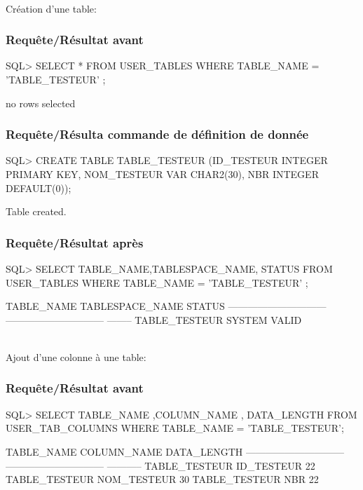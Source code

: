 \documentclass[•]{article}
\begin{document}
\textrm{ }
\\
\textrm{Création d'une table:}
\subsubsection{Requête/Résultat avant}
\begin{sql}
 SQL> SELECT * FROM USER_TABLES WHERE TABLE_NAME = 'TABLE_TESTEUR' ;

no rows selected
\end{sql}
\subsubsection{Requête/Résulta commande de définition de donnée}
\begin{sql}
SQL> CREATE TABLE TABLE_TESTEUR (ID_TESTEUR INTEGER PRIMARY KEY, NOM_TESTEUR VAR
CHAR2(30), NBR INTEGER DEFAULT(0));

Table created.
\end{sql}
\subsubsection{Requête/Résultat après}
\begin{sql}
 SQL> SELECT TABLE_NAME,TABLESPACE_NAME, STATUS FROM USER_TABLES WHERE TABLE_NAME
 = 'TABLE_TESTEUR' ;

TABLE_NAME                     TABLESPACE_NAME                STATUS
------------------------------ ------------------------------ --------
TABLE_TESTEUR                  SYSTEM                         VALID
\end{sql}

\textrm{ }
\\
\textrm{Ajout d'une colonne à une table:}
\subsubsection{Requête/Résultat avant}
\begin{sql}
 SQL> SELECT TABLE_NAME ,COLUMN_NAME , DATA_LENGTH FROM USER_TAB_COLUMNS WHERE TABLE_NAME = 'TABLE_TESTEUR';
 
 TABLE_NAME                     COLUMN_NAME                    DATA_LENGTH
------------------------------ ------------------------------ -----------
TABLE_TESTEUR                  ID_TESTEUR                              22
TABLE_TESTEUR                  NOM_TESTEUR                             30
TABLE_TESTEUR                  NBR                                     22

\end{sql}
\end{document}
